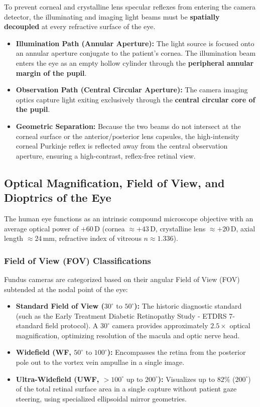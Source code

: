 \documentclass[11pt,a4paper]{article}
\begin{document}
\begin{opticalprinciples}
To prevent corneal and crystalline lens specular reflexes from entering the camera detector, the illuminating and imaging light beams must be \textbf{spatially decoupled} at every refractive surface of the eye.
\begin{itemize}[leftmargin=*]
    \item \textbf{Illumination Path (Annular Aperture):} The light source is focused onto an annular aperture conjugate to the patient's cornea. The illumination beam enters the eye as an empty hollow cylinder through the \textbf{peripheral annular margin of the pupil}.
    \item \textbf{Observation Path (Central Circular Aperture):} The camera imaging optics capture light exiting exclusively through the \textbf{central circular core of the pupil}.
    \item \textbf{Geometric Separation:} Because the two beams do not intersect at the corneal surface or the anterior/posterior lens capsules, the high-intensity corneal Purkinje reflex is reflected away from the central observation aperture, ensuring a high-contrast, reflex-free retinal view.
\end{itemize}
\end{opticalprinciples}

\subsection{Optical Magnification, Field of View, and Dioptrics of the Eye}

The human eye functions as an intrinsic compound microscope objective with an average optical power of $+60\,\text{D}$ (cornea $\approx +43\,\text{D}$, crystalline lens $\approx +20\,\text{D}$, axial length $\approx 24\,\text{mm}$, refractive index of vitreous $n \approx 1.336$).

\subsubsection{Field of View (FOV) Classifications}
Fundus cameras are categorized based on their angular Field of View (FOV) subtended at the nodal point of the eye:
\begin{itemize}[leftmargin=*]
    \item \textbf{Standard Field of View ($30^\circ\text{ to }50^\circ$):} The historic diagnostic standard (such as the Early Treatment Diabetic Retinopathy Study - ETDRS 7-standard field protocol). A $30^\circ$ camera provides approximately $2.5\times$ optical magnification, optimizing resolution of the macula and optic nerve head.
    \item \textbf{Widefield (WF, $50^\circ\text{ to }100^\circ$):} Encompasses the retina from the posterior pole out to the vortex vein ampullae in a single image.
    \item \textbf{Ultra-Widefield (UWF, $> 100^\circ\text{ up to }200^\circ$):} Visualizes up to $82\%$ ($200^\circ$) of the total retinal surface area in a single capture without patient gaze steering, using specialized ellipsoidal mirror geometries.
\end{itemize}
\end{document}
